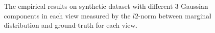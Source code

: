 \documentclass[11pt]{article}
\begin{document}
\begin{figure}
\caption{The empirical results on synthetic dataset with different 3 Gaussian components in each view measured by the $l2$-norm between marginal distribution and ground-truth for each view.}
\end{figure}
\end{document}
